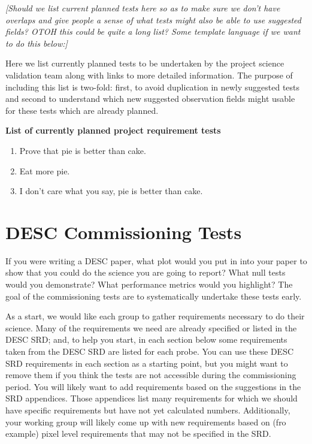 \documentclass[modern]{desc-tex/styles/lsstdescnote}
\begin{document}
{\it [Should we list current planned tests here so as to make sure we don't have overlaps and give people a sense of what tests might also be able to use suggested fields?  OTOH this could be quite a long list?  Some template language if we want to do this below:] }

Here we list currently planned tests to be undertaken by the project science validation team along with links to more detailed information.  The purpose of including this list is two-fold: first, to avoid duplication in newly suggested tests and second to understand which new suggested observation fields might usable for these tests which are already planned.

\noindent
{\bf List of currently planned project requirement tests}
\begin{enumerate}
\item Prove that pie is better than cake.
\item Eat more pie.
\item I don't care what you say, pie is better than cake.
\end{enumerate}

\section{DESC Commissioning Tests}

If you were writing a DESC paper, what plot would you put in into your paper to show that you could do the science you are going to report? What null tests would you demonstrate?  What performance metrics would you highlight?  The goal of the commissioning tests are to systematically undertake these tests early.

As a start, we would like each group to gather requirements necessary to do their science.  Many of the requirements we need are already specified or listed in the DESC SRD; and, to help you start, in each section below some requirements taken from the DESC SRD are listed for each probe.  You can use these DESC SRD requirements in each section as a starting point, but you might want to remove them if you think the tests are not accessible during the commissioning period. You will likely want to add requirements based on the suggestions in the SRD appendices.   Those appendices list many requirements for which we should have specific requirements but have not yet calculated numbers.   Additionally, your working group will likely come up with new requirements based on (fro example) pixel level requirements that may not be specified in the SRD.
\end{document}
